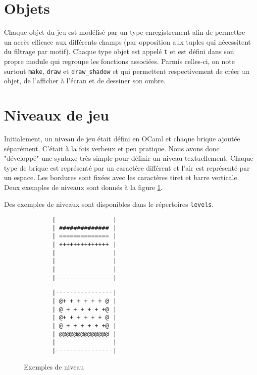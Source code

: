 \documentclass[french]{template}
\begin{document}
\section{Objets}

Chaque objet du jeu est modélisé par un type enregistrement afin de permettre un accès efficace aux différents champs (par opposition aux tuples qui nécessitent du filtrage par motif). Chaque type objet est appelé \texttt{t} et est défini dans son propre module qui regroupe les fonctions associées. Parmis celles-ci, on note surtout \texttt{make}, \texttt{draw} et \texttt{draw\_shadow} et qui permettent respectivement de créer un objet, de l'afficher à l'écran et de dessiner son ombre.

\section{Niveaux de jeu}

Initialement, un niveau de jeu était défini en OCaml et chaque brique ajoutée séparément. C'était à la fois verbeux et peu pratique. Nous avons donc "développé" une syntaxe très simple pour définir un niveau textuellement. Chaque type de brique est représenté par un caractère différent et l'air est représenté par un espace. Les bordures sont fixées avec les caractères tiret et barre verticale. Deux exemples de niveaux sont donnés à la figure \ref{fig:level.txt}.

Des exemples de niveaux sont disponibles dans le répertoires \texttt{levels}.

\begin{figure}[ht]
    \begin{minipage}{0.4\textwidth}
        \begin{verbatim}
        |----------------|
        | ############## |
        | ============== |
        | ++++++++++++++ |
        |                |
        |                |
        |                |
        |----------------|
        \end{verbatim}
    \end{minipage}
    \hfill
    \begin{minipage}{0.4\textwidth}
        \begin{verbatim}
        |----------------|
        | @+ + + + + + @ |
        | @ + + + + + +@ |
        | @+ + + + + + @ |
        | @ + + + + + +@ |
        | @@@@@@@@@@@@@@ |
        |                |
        |----------------|
        \end{verbatim}
    \end{minipage}
    \caption{Exemples de niveau}
    \label{fig:level.txt}
\end{figure}
\end{document}
